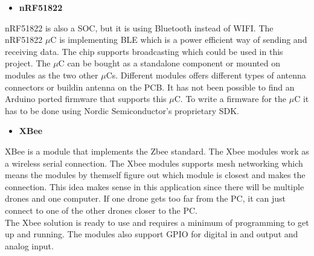 \begin{itemize}
	\item \textbf{nRF51822}
\end{itemize}
nRF51822 is also a SOC, but it is using Bluetooth instead of WIFI. The nRF51822 $\mu$C is implementing BLE which is a power efficient way of sending and receiving data. The chip supports broadcasting which could be used in this project. The $\mu$C can be bought as a standalone component or mounted on modules as the two other $\mu$Cs. Different modules offers different types of antenna connectors or buildin antenna on the PCB. It has not been possible to find an Arduino ported firmware that supports this $\mu$C. To write a firmware for the $\mu$C it has to be done using Nordic Semiconductor's proprietary SDK. 


\begin{itemize}
	\item \textbf{XBee}
\end{itemize}
XBee is a module that implements the Zbee standard. The Xbee modules work as a wireless serial connection. The Xbee modules supports mesh networking which means the modules by themself figure out which module is closest and makes the connection. This idea makes sense in this application since there will be multiple drones and one computer. If one drone gets too far from the PC, it can just connect to one of the other drones closer to the PC.\\
The Xbee solution is ready to use and requires a minimum of programming to get up and running. The modules also support GPIO for digital in and output and analog input.

